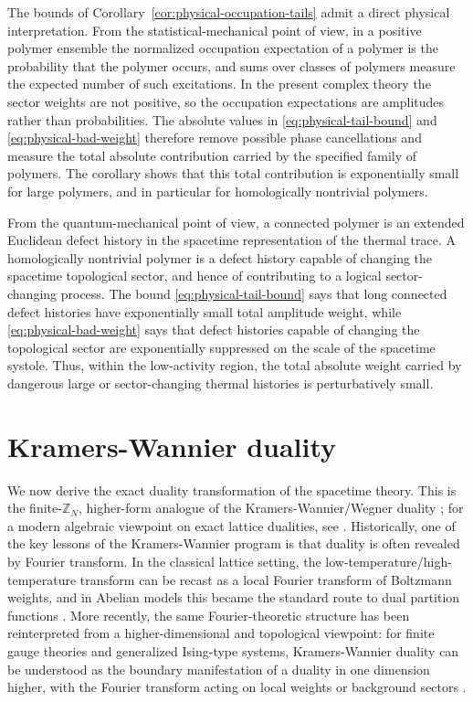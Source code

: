 \documentclass[dvipsnames,a4paper]{article}
\numberwithin{equation}{section}
\theoremstyle{definition}
\theoremstyle{remark}
\begin{document}
The bounds of Corollary~\ref{cor:physical-occupation-tails} admit a direct physical
interpretation. From the statistical-mechanical point of view, in a positive polymer
ensemble the normalized occupation expectation of a polymer is the probability that the
polymer occurs, and sums over classes of polymers measure the expected number of such
excitations. In the present complex theory the sector weights are not positive, so the
occupation expectations are amplitudes rather than probabilities. The absolute values in
\eqref{eq:physical-tail-bound} and \eqref{eq:physical-bad-weight} therefore remove possible
phase cancellations and measure the total absolute contribution carried by the specified
family of polymers. The corollary shows that this total contribution is exponentially
small for large polymers, and in particular for homologically nontrivial polymers.

From the quantum-mechanical point of view, a connected polymer is an extended Euclidean
defect history in the spacetime representation of the thermal trace. A homologically
nontrivial polymer is a defect history capable of changing the spacetime topological
sector, and hence of contributing to a logical sector-changing process. The bound
\eqref{eq:physical-tail-bound} says that long connected defect histories have
exponentially small total amplitude weight, while \eqref{eq:physical-bad-weight} says
that defect histories capable of changing the topological sector are exponentially
suppressed on the scale of the spacetime systole. Thus, within the low-activity region,
the total absolute weight carried by dangerous large or sector-changing thermal histories
is perturbatively small.





\section{Kramers-Wannier duality}
\label{sec:KW-duality}

We now derive the exact duality transformation of the spacetime theory. This is the
finite-\(\mathbb Z_N\), higher-form analogue of the
Kramers-Wannier/Wegner duality
\cite{KramersWannier1941,Wegner:1971app,Savit1980,ElitzurPearsonShigemitsu1979}; for a
modern algebraic viewpoint on exact lattice dualities, see
\cite{CobaneraOrtizNussinov2011}. Historically, one of the key lessons of the
Kramers-Wannier program is that duality is often revealed by Fourier transform.
In the classical lattice setting, the low-temperature/high-temperature transform can be
recast as a local Fourier transform of Boltzmann weights, and in Abelian models this
became the standard route to dual partition functions
\cite{KramersWannier1941,Wegner:1971app,Savit1980}. More recently, the same Fourier-theoretic
structure has been reinterpreted from a higher-dimensional and topological viewpoint:
for finite gauge theories and generalized Ising-type systems, Kramers-Wannier duality can be
understood as the boundary manifestation of a duality in one dimension higher, with the
Fourier transform acting on local weights or background sectors
\cite{FreedTeleman2022,DelcampIshtiaque2024}.
\end{document}
